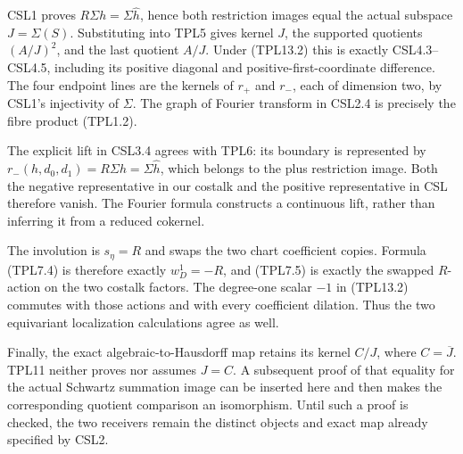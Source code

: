 CSL1 proves \(R\Sigma h=\Sigma\widehat h\), hence both restriction
images equal the actual subspace \(J=\Sigma(S)\). Substituting into TPL5
gives kernel \(J\), the supported quotients \((A/J)^2\), and the last
quotient \(A/J\). Under (TPL13.2) this is exactly CSL4.3--CSL4.5,
including its positive diagonal and positive-first-coordinate
difference. The four endpoint lines are the kernels of \(r_+\) and
\(r_-\), each of dimension two, by CSL1's injectivity of \(\Sigma\). The
graph of Fourier transform in CSL2.4 is precisely the fibre product
(TPL1.2).

The explicit lift in CSL3.4 agrees with TPL6: its boundary is
represented by \(r_-(h,d_0,d_1)=R\Sigma h=\Sigma\widehat h\), which
belongs to the plus restriction image. Both the negative representative
in our costalk and the positive representative in CSL therefore vanish.
The Fourier formula constructs a continuous lift, rather than inferring
it from a reduced cokernel.

The involution is \(s_\eta=R\) and swaps the two chart coefficient
copies. Formula (TPL7.4) is therefore exactly \(w_D^1=-R\), and (TPL7.5)
is exactly the swapped \(R\)-action on the two costalk factors. The
degree-one scalar \(-1\) in (TPL13.2) commutes with those actions and
with every coefficient dilation. Thus the two equivariant localization
calculations agree as well.

Finally, the exact algebraic-to-Hausdorff map retains its kernel
\(C/J\), where \(C=\overline J\). TPL11 neither proves nor assumes
\(J=C\). A subsequent proof of that equality for the actual Schwartz
summation image can be inserted here and then makes the corresponding
quotient comparison an isomorphism. Until such a proof is checked, the
two receivers remain the distinct objects and exact map already
specified by CSL2.
